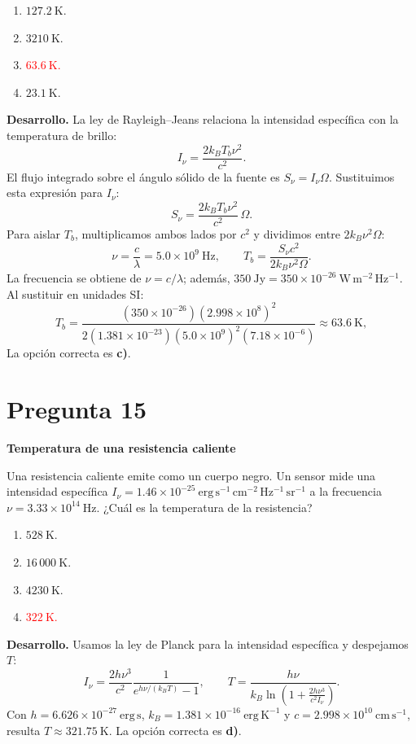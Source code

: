 \documentclass[a4paper,11pt]{article}
\newcommand{\pregunta}[2]{\section*{Pregunta #1}\textbf{#2}\par}
\begin{document}
\begin{enumerate}
    \item $127.2\ \mathrm{K}$.
    \item $3210\ \mathrm{K}$.
    \item \textcolor{red}{$63.6\ \mathrm{K}$.}
    \item $23.1\ \mathrm{K}$.
\end{enumerate}



\textbf{Desarrollo.} La ley de Rayleigh--Jeans relaciona la intensidad específica con la temperatura de brillo:
\[
I_\nu=\frac{2k_BT_b\nu^2}{c^2}.
\]
El flujo integrado sobre el ángulo sólido de la fuente es $S_\nu=I_\nu\Omega$. Sustituimos esta expresión para $I_\nu$:
\[
S_\nu=\frac{2k_BT_b\nu^2}{c^2}\,\Omega.
\]
Para aislar $T_b$, multiplicamos ambos lados por $c^2$ y dividimos entre $2k_B\nu^2\Omega$:
\[
\nu=\frac{c}{\lambda}=5.0\times10^9\ \mathrm{Hz},\qquad
T_b=\frac{S_\nu c^2}{2k_B\nu^2\Omega}.
\]
La frecuencia se obtiene de $\nu=c/\lambda$; además, $350\ \mathrm{Jy}=350\times10^{-26}\ \mathrm{W\,m^{-2}\,Hz^{-1}}$. Al sustituir en unidades SI:
\[
T_b=\frac{(350\times10^{-26})(2.998\times10^8)^2}
{2(1.381\times10^{-23})(5.0\times10^9)^2(7.18\times10^{-6})}
\approx63.6\ \mathrm{K},
\]
La opción correcta es \textbf{c)}. \parencite[Sec. 9.7, p. 297; Sec. 10.3.1, pp. 327--328]{chaparro2026}

\pregunta{15}{Temperatura de una resistencia caliente}

Una resistencia caliente emite como un cuerpo negro. Un sensor mide una intensidad específica $I_\nu=1.46\times10^{-25}\ \mathrm{erg\,s^{-1}\,cm^{-2}\,Hz^{-1}\,sr^{-1}}$ a la frecuencia $\nu=3.33\times10^{14}\ \mathrm{Hz}$. ¿Cuál es la temperatura de la resistencia?

\begin{enumerate}
    \item $528\ \mathrm{K}$.
    \item $16\,000\ \mathrm{K}$.
    \item $4230\ \mathrm{K}$.
    \item \textcolor{red}{$322\ \mathrm{K}$.}
\end{enumerate}

\textbf{Desarrollo.} Usamos la ley de Planck para la intensidad específica y despejamos $T$:
\[
I_\nu=\frac{2h\nu^3}{c^2}\frac{1}{e^{h\nu/(k_BT)}-1},
\qquad
T=\frac{h\nu}{k_B\ln\!\left(1+\frac{2h\nu^3}{c^2I_\nu}\right)}.
\]
Con $h=6.626\times10^{-27}\ \mathrm{erg\,s}$, $k_B=1.381\times10^{-16}\ \mathrm{erg\,K^{-1}}$ y $c=2.998\times10^{10}\ \mathrm{cm\,s^{-1}}$, resulta $T\approx321.75\ \mathrm{K}$.
La opción correcta es \textbf{d)}. \parencite[Sec. 10.1, pp. 308--310]{chaparro2026}
\end{document}
